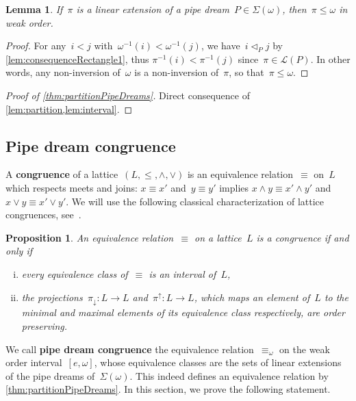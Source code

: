 \documentclass{amsart}
\newtheorem{proposition}[theorem]{Proposition}
\newtheorem{lemma}[theorem]{Lemma}
\theoremstyle{definition}
\newcommand{\defn}[1]{\textbf{\textsf{\color{PineGreen} #1}}} %
\newcommand{\acyclicPipeDreams}{\Sigma} %
\newcommand{\linearExtensions}{\mathcal{L}} %
\newcommand{\meet}{\wedge} %
\newcommand{\join}{\vee} %
\newcommand{\less}{\vartriangleleft} %
\newcommand{\contactLess}[1]{\less_{#1}} %
\newcommand{\projDown}{\pi_\downarrow} %
\newcommand{\projUp}{\pi^\uparrow} %
\begin{document}
\begin{lemma}
\label{lem:interval}
If~$\pi$ is a linear extension of a pipe dream~$P \in \acyclicPipeDreams(\omega)$, then~$\pi \le \omega$ in weak order.
\end{lemma}

\begin{proof}
For any~$i < j$ with~$\omega^{-1}(i) < \omega^{-1}(j)$, we have~$i \contactLess{P} j$ by \cref{lem:consequenceRectangle1}, thus ${\pi^{-1}(i) < \pi^{-1}(j)}$ since~$\pi \in \linearExtensions(P)$.
In other words, any non-inversion of~$\omega$ is a non-inversion of~$\pi$, so that~${\pi \le \omega}$.
\end{proof}

\begin{proof}[Proof of \cref{thm:partitionPipeDreams}]
Direct consequence of \cref{lem:partition,lem:interval}.
\end{proof}


\subsection{Pipe dream congruence}
\label{subsec:pipeDreamCongruence}

A \defn{congruence} of a lattice~$(L, \le, \meet, \join)$ is an equivalence relation~$\equiv$ on~$L$ which respects meets and joins: $x \equiv x'$ and~$y \equiv y'$ implies $x \meet y \equiv x' \meet y'$ and~$x \join y \equiv x' \join y'$.
We will use the following classical characterization of lattice congruences, see~\cite{Reading-PosetRegionsChapter}.

\begin{proposition}
\label{prop:characterizationCongruences}
An equivalence relation~$\equiv$ on a lattice~$L$ is a congruence if and only if
\begin{enumerate}[(i)]
\item every equivalence class of~$\equiv$ is an interval of~$L$,
\item the projections~$\projDown : L \to L$ and~$\projUp : L \to L$, which maps an element of~$L$ to the minimal and maximal elements of its equivalence class respectively, are order preserving.
\end{enumerate}
\end{proposition}

We call \defn{pipe dream congruence} the equivalence relation~$\equiv_\omega$ on the weak order interval~$[e,\omega]$, whose equivalence classes are the sets of linear extensions of the pipe dreams of~$\acyclicPipeDreams(\omega)$.
This indeed defines an equivalence relation by \cref{thm:partitionPipeDreams}.
In this section, we prove the following statement.
\end{document}
